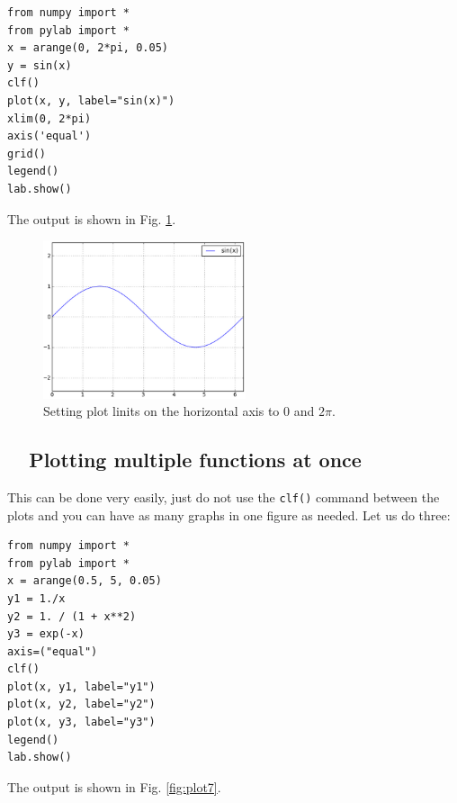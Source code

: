 \begin{verbatim}
from numpy import *
from pylab import *
x = arange(0, 2*pi, 0.05)
y = sin(x)
clf()
plot(x, y, label="sin(x)")
xlim(0, 2*pi)
axis('equal')
grid()
legend()
lab.show()
\end{verbatim}
\noindent
The output is shown in Fig. \ref{fig:plot9}.
\newpage

\begin{figure}[!ht]
\begin{center}
\includegraphics[width=0.53\textwidth]{imgp/plot9.png}
\end{center}
\vspace{-4mm}
\caption{Setting plot linits on the horizontal axis to $0$ and $2\pi$.}
\label{fig:plot9}
\vspace{-2mm}
\end{figure}
\noindent


\subsection{\ \ Plotting multiple functions at once}

This can be done very easily, just do not use the {\tt clf()}
command between the plots and you can have as many graphs 
in one figure as needed. Let us do three:

\begin{verbatim}
from numpy import *
from pylab import *
x = arange(0.5, 5, 0.05)
y1 = 1./x
y2 = 1. / (1 + x**2)
y3 = exp(-x)
axis=("equal")
clf()
plot(x, y1, label="y1")
plot(x, y2, label="y2")
plot(x, y3, label="y3")
legend()
lab.show()
\end{verbatim}
\noindent
The output is shown in Fig. \ref{fig:plot7}.
\newpage

